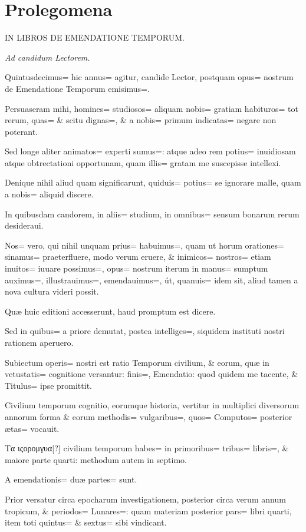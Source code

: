 \chapter{Prolegomena}
\begin{center}
\textsc{IN LIBROS DE EMENDATIONE TEMPORUM.}

\em{Ad candidum Lectorem.}
\end{center}
\begin{parnumbers}
Quintusdecimus= hic annus= agitur, candide Lector, postquam opus= nostrum de Emendatione Temporum emisimus=. 

Persuaseram mihi, homines= studiosos= aliquam nobis= gratiam habituros= tot rerum, quas= \& scitu dignas=, \& a nobis= primum indicatas= negare non poterant.

Sed longe aliter animatos= experti sumus=: atque adeo rem potius= inuidiosam atque obtrectationi opportunam, quam illis= gratam me suscepisse intellexi.

Denique nihil aliud quam significarunt, quiduis= potius= se ignorare malle, quam a nobis= aliquid discere.

In quibusdam candorem, in aliis= studium, in omnibus= sensum bonarum rerum desideraui.

Nos= vero, qui nihil unquam prius= habuimus=, quam ut horum orationes= sinamus= praeterfluere, modo verum eruere, \& inimicos= nostros= etiam inuitos= iuuare possimus=, opus= nostrum iterum in manus= sumptum auximus=, illustrauimus=, emendauimus=, út, quanuis= idem sit, aliud tamen a nova cultura videri possit.

Quæ huic editioni accesserunt, haud promptum est dicere.

Sed in quibus= a priore demutat, postea intelliges=, siquidem instituti nostri rationem aperuero.

Subiectum operis= nostri est ratio Temporum civilium, \& eorum, quæ in vetustatis= cognitione versantur: finis=, Emendatio: quod quidem me tacente, \& Titulus= ipse promittit.

Civilium temporum cognitio, eorumque historia, vertitur in multiplici diversorum annorum forma \& eorum methodis= vulgaribus=, quos= Computos= posterior ætas= vocauit.

Τα ιςορομγυα[?] civilium temporum habes= in primoribus= tribus= libris=, \& maiore parte quarti: methodum autem in septimo.

A emendationis= duæ partes= sunt.

Prior versatur circa epocharum investigationem, posterior circa verum annum tropicum, \& periodos= Lunares=: quam materiam posterior pars= libri quarti, item toti quintus= \& sextus= sibi vindicant.


\end{parnumbers}
